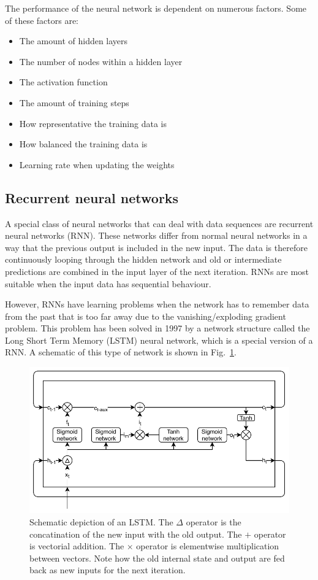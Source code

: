 \documentclass[journal,10pt,twoside, a4paper]{IEEEtran}
\begin{document}
The performance of the neural network is dependent on numerous factors. Some of these factors are:
\begin{itemize}
    \item The amount of hidden layers
    \item The number of nodes within a hidden layer
    \item The activation function
    \item The amount of training steps
    \item How representative the training data is
    \item How balanced the training data is
    \item Learning rate when updating the weights
\end{itemize}

\subsection{Recurrent neural networks}
A special class of neural networks that can deal with data sequences are recurrent neural networks (RNN). These networks differ from normal neural networks in a way that the previous output is included in the new input. The data is therefore continuously looping through the hidden network and old or intermediate predictions are combined in the input layer of the next iteration. RNNs are most suitable when the input data has sequential behaviour.

However, RNNs have learning problems when the network has to remember data from the past that is too far away due to the vanishing/exploding gradient problem. This problem has been solved in 1997 by a network structure called the Long Short Term Memory (LSTM)\cite{lstm} neural network, which is a special version of a RNN. A schematic of this type of network is shown in Fig.~\ref{fig:lstm}.

\begin{figure}
    \centering
    \includegraphics[width=\linewidth]{Thesis/images/lstm.pdf}
    \caption{Schematic depiction of an LSTM. The \textcircled{$\scriptstyle \Delta$} operator is the concatination of the new input with the old output. The \textcircled{$+$} operator is vectorial addition. The \textcircled{$\times$} operator is elementwise multiplication between vectors. Note how the old internal state and output are fed back as new inputs for the next iteration.}
    \label{fig:lstm}
\end{figure}
\end{document}
